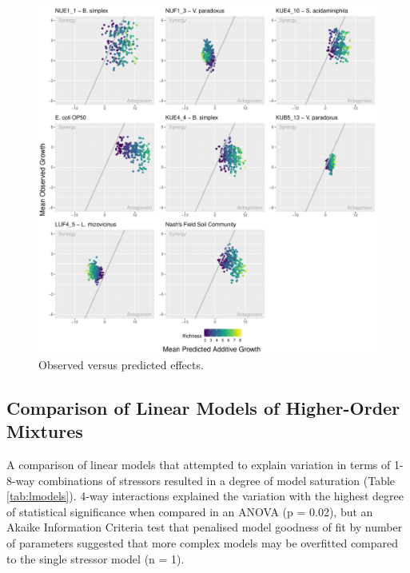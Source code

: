 \documentclass[final,1p,times]{elsarticle}
\begin{document}
\begin{figure}[H]
    \centering
    \includegraphics[width = \textwidth]{Scripts/Results/Final_Pipeline/ObservedXPredicted.pdf}
    \caption{Observed versus predicted effects.}
    \label{fig:obsXpred}
\end{figure}

\newpage
\subsection{Comparison of Linear Models of Higher-Order Mixtures}
\label{S:3:5}

A comparison of linear models that attempted to explain variation in terms of 1-8-way combinations of stressors resulted in a degree of model saturation (Table \ref{tab:lmodels}). 4-way interactions explained the variation with the highest degree of statistical significance when compared in an ANOVA (p = 0.02), but an Akaike Information Criteria test that penalised model goodness of fit by number of parameters suggested that more complex models may be overfitted compared to the single stressor model (n = 1). 
\end{document}

